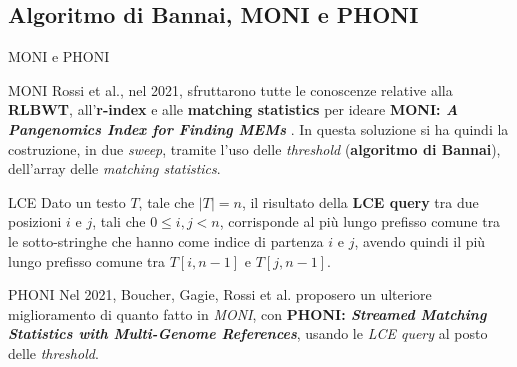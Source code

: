 \documentclass{beamer}
\begin{document}
\subsection{Algoritmo di Bannai, MONI e PHONI}
\begin{frame}{MONI e PHONI}
  \begin{block}{MONI}
    \small
    Rossi et al., nel 2021, sfruttarono tutte le conoscenze relative
    alla \textbf{RLBWT}, all'\textbf{r-index} e alle \textbf{matching statistics}
    per ideare \textbf{MONI:\textit{ A Pangenomics Index for Finding MEMs}}
    \cite{moni}. In questa soluzione si ha quindi la costruzione, in due
    \textit{sweep}, tramite l'uso delle \textit{threshold} (\textbf{algoritmo di
      Bannai}), dell'array delle 
    \textit{matching statistics}. 
  \end{block}
  \pause
  \begin{block}{LCE}
    \small
      Dato un testo $T$, tale che $|T|=n$, il risultato della \textbf{LCE query}
      tra 
      due posizioni $i$ e $j$, tali che $0\leq i,j<n$, corrisponde al più lungo
      prefisso comune tra le sotto-stringhe che hanno come indice di partenza
      $i$ e 
      $j$, avendo quindi il più lungo prefisso comune tra $T[i,n-1]$ e
      $T[j,n-1]$. 
  \end{block}
  \pause
  \begin{block}{PHONI}
    \small
    Nel 2021, Boucher, Gagie, Rossi et al. proposero un ulteriore miglioramento di
    quanto fatto in \textit{MONI}, con \textbf{PHONI: \textit{Streamed Matching
        Statistics with Multi-Genome References}}\cite{phoni}, usando le
    \textit{LCE query} 
    al posto delle \textit{threshold}.
  \end{block}
\end{frame}
\end{document}
